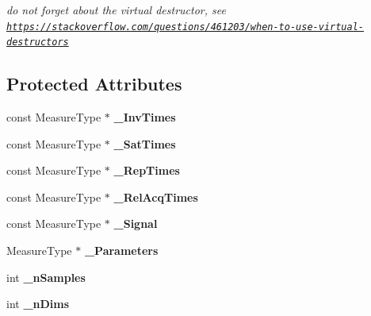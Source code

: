 \begin{DoxyCompactItemize}
\begin{DoxyCompactList}\small\item\em do not forget about the virtual destructor, see \href{https://stackoverflow.com/questions/461203/when-to-use-virtual-destructors}{\tt https\-://stackoverflow.\-com/questions/461203/when-\/to-\/use-\/virtual-\/destructors} \end{DoxyCompactList}\end{DoxyCompactItemize}
\subsection*{Protected Attributes}
\begin{DoxyCompactItemize}
\item 
\hypertarget{class_ox_1_1_functions_t1_a4e92c3f06b7ef0327d6625a662db4d1c}{const Measure\-Type $\ast$ {\bfseries \-\_\-\-Inv\-Times}}\label{class_ox_1_1_functions_t1_a4e92c3f06b7ef0327d6625a662db4d1c}

\item 
\hypertarget{class_ox_1_1_functions_t1_a094382559b692b554e8ad1453c27ee50}{const Measure\-Type $\ast$ {\bfseries \-\_\-\-Sat\-Times}}\label{class_ox_1_1_functions_t1_a094382559b692b554e8ad1453c27ee50}

\item 
\hypertarget{class_ox_1_1_functions_t1_a719873f2f02b6dcf0ae100f9c9a6884f}{const Measure\-Type $\ast$ {\bfseries \-\_\-\-Rep\-Times}}\label{class_ox_1_1_functions_t1_a719873f2f02b6dcf0ae100f9c9a6884f}

\item 
\hypertarget{class_ox_1_1_functions_t1_abfbc38cf7ea0bbc1b52f48a75f281246}{const Measure\-Type $\ast$ {\bfseries \-\_\-\-Rel\-Acq\-Times}}\label{class_ox_1_1_functions_t1_abfbc38cf7ea0bbc1b52f48a75f281246}

\item 
\hypertarget{class_ox_1_1_functions_t1_a8f87abd26c39fddd3e2b0085e97c6571}{const Measure\-Type $\ast$ {\bfseries \-\_\-\-Signal}}\label{class_ox_1_1_functions_t1_a8f87abd26c39fddd3e2b0085e97c6571}

\item 
\hypertarget{class_ox_1_1_functions_t1_a6958f5841b785da10dcd1c1c777799c7}{Measure\-Type $\ast$ {\bfseries \-\_\-\-Parameters}}\label{class_ox_1_1_functions_t1_a6958f5841b785da10dcd1c1c777799c7}

\item 
\hypertarget{class_ox_1_1_functions_t1_a32038248ea53c223d9d99cd9cee36378}{int {\bfseries \-\_\-n\-Samples}}\label{class_ox_1_1_functions_t1_a32038248ea53c223d9d99cd9cee36378}

\item 
\hypertarget{class_ox_1_1_functions_t1_a4d42b89cb62d20c80e3210b17a692ed1}{int {\bfseries \-\_\-n\-Dims}}\label{class_ox_1_1_functions_t1_a4d42b89cb62d20c80e3210b17a692ed1}

\end{DoxyCompactItemize}


